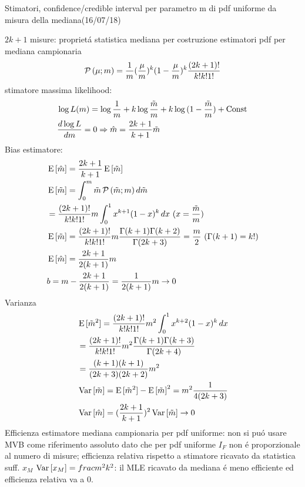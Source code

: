 \begin{wordonframe}{Stimatori, confidence/credible interval per parametro m di pdf uniforme da misura della mediana(16/07/18)}
\begin{block}{$2k+1$ misure: propriet\'a statistica mediana per costruzione estimatori}
		pdf per mediana campionaria
		\begin{equation*}
		\prob{(\mu;m)}=\frac{1}{m}(\frac{\mu}{m})^k(1-\frac{\mu}{m})^k\frac{(2k+1)!}{k!k!1!}
		\end{equation*}
		stimatore massima likelihood:
		\begin{align*}
		&\log{L(m)}=\log{\frac{1}{m}}+k\log{\frac{\tilde{m}}{m}}+k\log{(1-\frac{\tilde{m}}{m})}+\const{}\\
		&\TDy{m}{\log{L}}=0 \Rightarrow \hat{m}=\frac{2k+1}{k+1}\tilde{m}
		\end{align*}
		Bias estimatore:
		\begin{align*}
		&\E{[\hat{m}]}=\frac{2k+1}{k+1}\E{[\tilde{m}]}\\
		&\E{[\tilde{m}]}=\int_0^m\tilde{m}\prob{(\tilde{m};m)}\,d\tilde{m}\\
		&=\frac{(2k+1)!}{k!k!1!}m\int_0^1x^{k+1}(1-x)^k\,dx\ (x=\frac{\tilde{m}}{m})\\
		&\E{[\tilde{m}]}=\frac{(2k+1)!}{k!k!1!}m\frac{\Gamma(k+1)\Gamma(k+2)}{\Gamma(2k+3)}=\frac{m}{2}\ (\Gamma(k+1)=k!)\\
		&\E{[\hat{m}]}=\frac{2k+1}{2(k+1)}m\\
		&b=m-\frac{2k+1}{2(k+1)}=\frac{1}{2(k+1)}m\to0
		\end{align*}
		Varianza
		\begin{align*}
		&\E{[\tilde{m}^2]}=\frac{(2k+1)!}{k!k!1!}m^2\int_0^1x^{k+2}(1-x)^k\,dx\\
		&=\frac{(2k+1)!}{k!k!1!}m^2\frac{\Gamma(k+1)\Gamma(k+3)}{\Gamma(2k+4)}\\
		&=\frac{(k+1)(k+1)}{(2k+3)(2k+2)}m^2\\
		&\var{[\tilde{m}]}=\E{[\tilde{m}^2]}-\E{[\tilde{m}]}^2=m^2\frac{1}{4(2k+3)}\\
		&\var{[\hat{m}]}=(\frac{2k+1}{k+1})^2\var{[\tilde{m}]}\to0
		\end{align*}
		Efficienza estimatore mediana campionaria per pdf uniforme: non si pu\'o usare MVB come riferimento assoluto dato che per pdf uniforme $I_F$ non \'e proporzionale al numero di misure; efficienza relativa rispetto a stimatore ricavato da statistica suff. $x_M$ $\var{[x_M]}=frac{m^2}{k^2}$: il MLE ricavato da mediana \'e meno efficiente ed efficienza relativa va a 0.
	\end{block}
\end{wordonframe}

